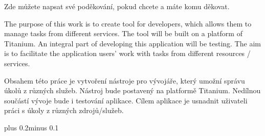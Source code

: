 \documentclass[11pt,oneside,a4paper]{book}
\begin{document}

\coverpagestarts


\acknowledgements
\noindent
Zde můžete napsat své poděkování, pokud chcete a máte komu děkovat.



 
\abstractpage
The purpose of this work is to create tool for developers, which allows them to manage tasks from different services. The tool will be built on a platform of Titanium. An integral part of developing this application will be testing. The aim is to facilitate the application users' work with tasks from different resources / services.


\baselineskip

\noindent
Obsahem této práce je vytvoření nástroje pro vývojáře, který umožní správu úkolů z různých služeb. Nástroj bude postavený na platformě Titanium. Nedílnou součástí vývoje bude i testování aplikace. Cílem aplikace je usnadnit uživateli práci s úkoly z různých zdrojů/služeb.


\tableofcontents



\listoffigures



\listoftables



\mainbodystarts
\normalfont
{}\baselineskip plus 0.2\baselineskip minus 0.1\baselineskip



\end{document}
